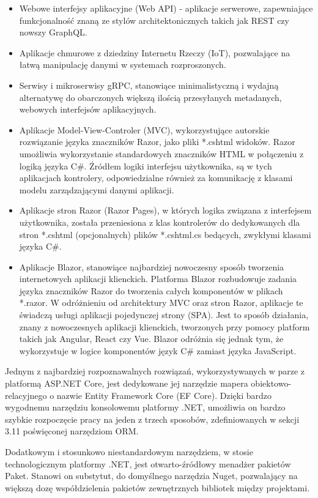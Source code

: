 \begin{itemize}
    \item Webowe interfejsy aplikacyjne (Web API) - aplikacje serwerowe, zapewniające funkcjonalność znaną ze stylów architektonicznych takich jak REST czy nowszy GraphQL. 
    \item Aplikacje chmurowe z dziedziny Internetu Rzeczy (IoT), pozwalające na łatwą manipulację danymi w systemach rozproszonych.
    \item Serwisy i mikroserwisy gRPC, stanowiące minimalistyczną i wydajną alternatywę do obarczonych większą ilością przesyłanych metadanych, webowych interfejsów aplikacyjnych.
    \item Aplikacje Model-View-Controler (MVC), wykorzystujące autorskie rozwiązanie języka znaczników Razor, jako pliki *.cshtml widoków. Razor umożliwia wykorzystanie standardowych znaczników HTML w połączeniu z logiką języka C\#. Źródłem logiki interfejsu użytkownika, są w tych aplikacjach kontrolery, odpowiedzialne również za komunikację z klasami modelu zarządzającymi danymi aplikacji.
    \item Aplikacje stron Razor (Razor Pages), w których logika związana z interfejsem użytkownika, została przeniesiona z klas kontrolerów do dedykowanych dla stron *.cshtml (opcjonalnych) plików *.cshtml.cs bedących, zwykłymi klasami języka C\#.
    \item Aplikacje Blazor, stanowiące najbardziej nowoczesny sposób tworzenia internetowych aplikacji klienckich. Platforma Blazor rozbudowuje zadania języka znaczników Razor do tworzenia całych komponentów w plikach *.razor. W odróżnieniu od architektury MVC oraz stron Razor, aplikacje te świadczą usługi aplikacji pojedynczej strony (SPA). Jest to sposób działania, znany z nowoczesnych aplikacji klienckich, tworzonych przy pomocy platform takich jak Angular, React czy Vue. Blazor odróżnia się jednak tym, że wykorzystuje w logice komponentów język C\# zamiast języka JavaScript.
\end{itemize}

Jednym z najbardziej rozpoznawalnych rozwiązań, wykorzystywanych w parze z platformą ASP.NET Core, jest dedykowane jej narzędzie mapera obiektowo-relacyjnego o nazwie Entity Framework Core (EF Core). Dzięki bardzo wygodnemu narzędziu konsolowemu platformy .NET, umożliwia on bardzo szybkie rozpoczęcie pracy na jeden z trzech sposobów, zdefiniowanych w sekcji 3.11 poświęconej narzędziom ORM.

Dodatkowym i stosunkowo niestandardowym narzędziem, w stosie technologicznym platformy .NET, jest otwarto-źródłowy menadżer pakietów Paket. Stanowi on substytut, do domyślnego narzędzia Nuget, pozwalający na większą dozę współdzielenia pakietów zewnętrznych bibliotek między projektami.

